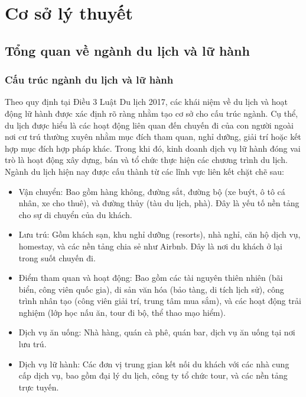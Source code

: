 \section{Cơ sở lý thuyết}
\subsection{Tổng quan về ngành du lịch và lữ hành}
\subsubsection{Cấu trúc ngành du lịch và lữ hành}
Theo quy định tại Điều 3 Luật Du lịch 2017, các khái niệm về du lịch và hoạt động lữ hành được xác định rõ ràng nhằm tạo cơ sở cho cấu trúc ngành. Cụ thể, du lịch được hiểu là các hoạt động liên quan đến chuyến đi của con người ngoài nơi cư trú thường xuyên nhằm mục đích tham quan, nghỉ dưỡng, giải trí hoặc kết hợp mục đích hợp pháp khác. Trong khi đó, kinh doanh dịch vụ lữ hành đóng vai trò là hoạt động xây dựng, bán và tổ chức thực hiện các chương trình du lịch. \cite{luat-du-lich-2017} \\
Ngành du lịch hiện nay được cấu thành từ các lĩnh vực liên kết chặt chẽ sau:
\begin{itemize}
    \item Vận chuyển: Bao gồm hàng không, đường sắt, đường bộ (xe buýt, ô tô cá nhân, xe cho thuê), và đường thủy (tàu du lịch, phà). Đây là yếu tố nền tảng cho sự di chuyển của du khách.
    \item Lưu trú: Gồm khách sạn, khu nghỉ dưỡng (resorts), nhà nghỉ, căn hộ dịch vụ, homestay, và các nền tảng chia sẻ như Airbnb. Đây là nơi du khách ở lại trong suốt chuyến đi.
    \item Điểm tham quan và hoạt động: Bao gồm các tài nguyên thiên nhiên (bãi biển, công viên quốc gia), di sản văn hóa (bảo tàng, di tích lịch sử), công trình nhân tạo (công viên giải trí, trung tâm mua sắm), và các hoạt động trải nghiệm (lớp học nấu ăn, tour đi bộ, thể thao mạo hiểm).
    \item Dịch vụ ăn uống: Nhà hàng, quán cà phê, quán bar, dịch vụ ăn uống tại nơi lưu trú.
    \item Dịch vụ lữ hành: Các đơn vị trung gian kết nối du khách với các nhà cung cấp dịch vụ, bao gồm đại lý du lịch, công ty tổ chức tour, và các nền tảng trực tuyến.
\end{itemize}

